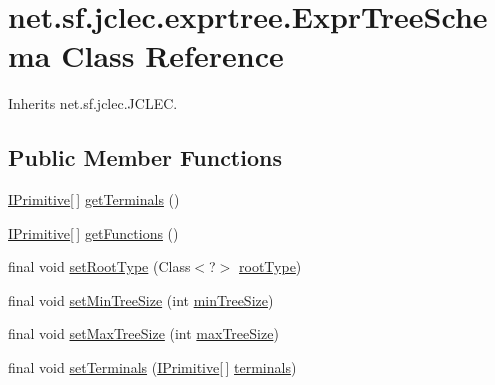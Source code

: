 \hypertarget{classnet_1_1sf_1_1jclec_1_1exprtree_1_1_expr_tree_schema}{\section{net.\-sf.\-jclec.\-exprtree.\-Expr\-Tree\-Schema Class Reference}
\label{classnet_1_1sf_1_1jclec_1_1exprtree_1_1_expr_tree_schema}
}


Inherits net.\-sf.\-jclec.\-J\-C\-L\-E\-C.

\subsection*{Public Member Functions}
\begin{DoxyCompactItemize}
\item 
\hyperlink{interfacenet_1_1sf_1_1jclec_1_1exprtree_1_1_i_primitive}{I\-Primitive}\mbox{[}$\,$\mbox{]} \hyperlink{classnet_1_1sf_1_1jclec_1_1exprtree_1_1_expr_tree_schema_a28d6438a7b490f5864def7b37c448f0c}{get\-Terminals} ()
\item 
\hyperlink{interfacenet_1_1sf_1_1jclec_1_1exprtree_1_1_i_primitive}{I\-Primitive}\mbox{[}$\,$\mbox{]} \hyperlink{classnet_1_1sf_1_1jclec_1_1exprtree_1_1_expr_tree_schema_a7593f2b31f1c8a7806b251aa9c537655}{get\-Functions} ()
\item 
final void \hyperlink{classnet_1_1sf_1_1jclec_1_1exprtree_1_1_expr_tree_schema_aa471670fe9fe10651ddb624c3337237c}{set\-Root\-Type} (Class$<$?$>$ \hyperlink{classnet_1_1sf_1_1jclec_1_1exprtree_1_1_expr_tree_schema_a249024518906b1b72f537d5b61ea16ff}{root\-Type})
\item 
final void \hyperlink{classnet_1_1sf_1_1jclec_1_1exprtree_1_1_expr_tree_schema_a64597f416b491f7b2a1d540765c8a5b2}{set\-Min\-Tree\-Size} (int \hyperlink{classnet_1_1sf_1_1jclec_1_1exprtree_1_1_expr_tree_schema_a1ac93c0fc7bd111a376ab405ec7b8fb3}{min\-Tree\-Size})
\item 
final void \hyperlink{classnet_1_1sf_1_1jclec_1_1exprtree_1_1_expr_tree_schema_aa83a8f26b9c81bb7447cdfadd69432f3}{set\-Max\-Tree\-Size} (int \hyperlink{classnet_1_1sf_1_1jclec_1_1exprtree_1_1_expr_tree_schema_a5a222e091d9f7eaa07c7acee9b50efc1}{max\-Tree\-Size})
\item 
final void \hyperlink{classnet_1_1sf_1_1jclec_1_1exprtree_1_1_expr_tree_schema_aae23cd8acade2e2297bef23345e24b9f}{set\-Terminals} (\hyperlink{interfacenet_1_1sf_1_1jclec_1_1exprtree_1_1_i_primitive}{I\-Primitive}\mbox{[}$\,$\mbox{]} \hyperlink{classnet_1_1sf_1_1jclec_1_1exprtree_1_1_expr_tree_schema_aa60f19ae52e55d9ed07ca1089c88d65a}{terminals})

\end{DoxyCompactItemize}
